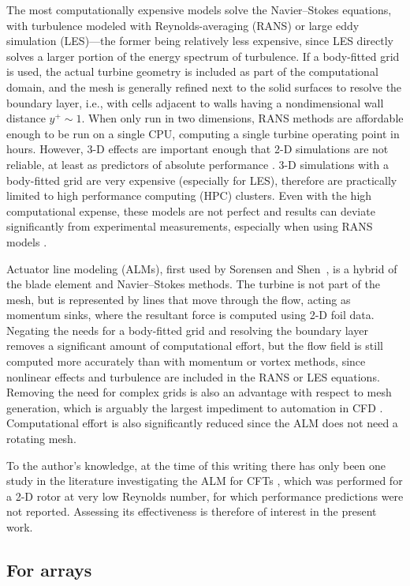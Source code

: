The most computationally expensive models solve the Navier--Stokes equations,
with turbulence modeled with Reynolds-averaging (RANS) or large eddy simulation
(LES)---the former being relatively less expensive, since LES directly solves a
larger portion of the energy spectrum of turbulence. If a body-fitted grid is
used, the actual turbine geometry is included as part of the computational
domain, and the mesh is generally refined next to the solid surfaces to resolve
the boundary layer, i.e., with cells adjacent to walls having a nondimensional
wall distance $y^+ \sim 1$. When only run in two dimensions, RANS methods are
affordable enough to be run on a single CPU, computing a single turbine
operating point in hours. However, 3-D effects are important enough that 2-D
simulations are not reliable, at least as predictors of absolute performance
\cite{Li2013}. 3-D simulations with a body-fitted grid are very expensive
(especially for LES), therefore are practically limited to high performance
computing (HPC) clusters. Even with the high computational expense, these models
are not perfect and results can deviate significantly from experimental
measurements, especially when using RANS models \cite{Li2013}.

Actuator line modeling (ALMs), first used by Sorensen and
Shen~\cite{Sorensen2002}, is a hybrid of the blade element and Navier--Stokes
methods. The turbine is not part of the mesh, but is represented by lines that
move through the flow, acting as momentum sinks, where the resultant force is
computed using 2-D foil data. Negating the needs for a body-fitted grid and
resolving the boundary layer removes a significant amount of computational
effort, but the flow field is still computed more accurately than with momentum
or vortex methods, since nonlinear effects and turbulence are included in the
RANS or LES equations. Removing the need for complex grids is also an advantage
with respect to  mesh generation, which is arguably the largest impediment to
automation in CFD \cite{Slotnick2014}. Computational effort is also
significantly reduced since the ALM does not need a rotating mesh.

To the author's knowledge, at the time of
this writing there has only been one study in the literature investigating the
ALM for CFTs \cite{Shamsoddin2014}, which was performed for a 2-D rotor at very
low Reynolds number, for which performance predictions were not reported.
Assessing its effectiveness is therefore of interest in the present work.


\subsection{For arrays}

